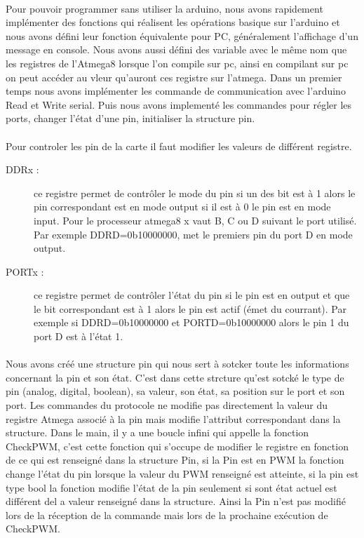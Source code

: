 \paragraph{}
Pour pouvoir programmer sans utiliser la arduino, nous avons rapidement implémenter des fonctions qui réalisent les opérations basique sur l'arduino et nous avons défini leur fonction équivalente pour PC, généralement l'affichage d'un message en console. Nous avons aussi défini des variable avec le même nom que les registres de l'Atmega8 lorsque l'on compile sur pc, ainsi en compilant sur pc on peut accéder au vleur qu'auront ces registre sur l'atmega.
Dans un premier temps nous avons implémenter les commande de communication avec l'arduino Read et Write serial. Puis nous avons implementé les commandes pour régler les ports, changer l'état d'une pin, initialiser la structure pin.

\paragraph{}
Pour controler les pin de la carte il faut modifier les valeurs de différent registre.
\begin{description}
\item[DDRx :] ce registre permet de contrôler le mode du pin si un des bit est à 1 alors le pin correspondant est en mode output si il est à 0 le pin est en mode input. Pour le processeur atmega8 x vaut B, C ou D suivant le port utilisé. Par exemple DDRD=0b10000000, met le premiers pin du port D en mode output.
\item[PORTx :] ce registre permet de contrôler l'état du pin si le pin est en output et que le bit correspondant est à 1 alors le pin est actif (émet du courrant). Par exemple si DDRD=0b10000000 et PORTD=0b10000000 alors le pin 1 du port D est à l'état 1.
\end{description}

\paragraph{}
Nous avons créé une structure pin qui nous sert à sotcker toute les informations concernant la pin et son état. C'est dans cette strcture qu'est sotcké le type de pin (analog, digital, boolean), sa valeur, son état, sa position sur le port et son port. Les commandes du protocole ne modifie pas directement la valeur du registre Atmega associé à la pin mais modifie l'attribut correspondant dans la structure. Dans le main, il y a une boucle infini qui appelle la fonction CheckPWM, c'est cette fonction qui s'occupe de modifier le registre en fonction de ce qui est renseigné dans la structure Pin, si la Pin est en PWM la fonction change l'état du pin lorsque la valeur du PWM renseigné est atteinte, si la pin est type bool la fonction modifie l'état de la pin seulement si sont état actuel est différent del a valeur renseigné dans la structure. Ainsi la Pin n'est pas modifié lors de la réception de la commande mais lors de la prochaine exécution de CheckPWM.

